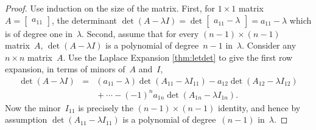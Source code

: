 \begin{proof} 
Use induction on the size of the matrix.
First, for \(1\times 1\) matrix \(A=\begin{bmatrix} a_{11} \end{bmatrix}\), the determinant \(\det(A-\lambda I)=\det \begin{bmatrix} a_{11}-\lambda \end{bmatrix}=a_{11}-\lambda\) which is of  degree one in~\(\lambda\).
Second, assume that for every \((n-1)\times (n-1)\) matrix~\(A\), \(\det(A-\lambda I)\) is a polynomial of degree~\(n-1\) in~\(\lambda\).
Consider any \(n\times n\) matrix~\(A\).
Use the Laplace Expansion \cref{thm:letdet} to give the first row expansion, in terms of minors of~\(A\) and~\(I\),
\begin{eqnarray*}
\det(A-\lambda I)
&=&(a_{11}-\lambda)\det (A_{11}-\lambda I_{11})
-a_{12}\det (A_{12}-\lambda I_{12})
\\&&{}
+\cdots-(-1)^{n}a_{1n}\det (A_{1n}-\lambda I_{1n}).
\end{eqnarray*}
Now the minor~\(I_{11}\) is precisely the \((n-1)\times(n-1)\) identity, and hence by assumption \(\det(A_{11}-\lambda I_{11})\) is a polynomial of degree~\((n-1)\) in~\(\lambda\).

\end{proof}
